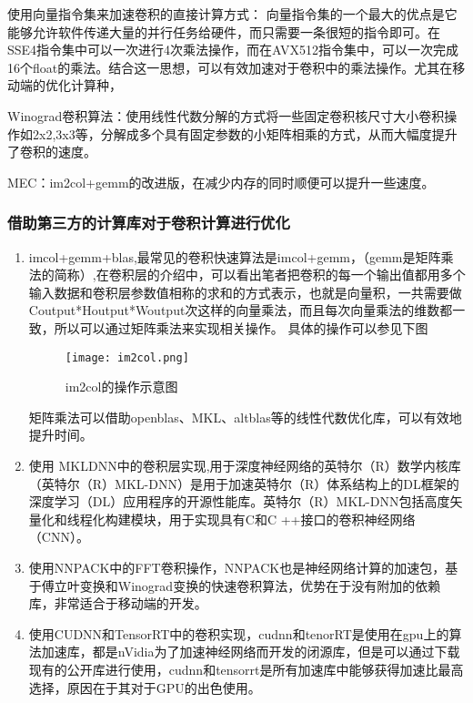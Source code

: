 使用向量指令集来加速卷积的直接计算方式：
向量指令集的一个最大的优点是它能够允许软件传递大量的并行任务给硬件，而只需要一条很短的指令即可。在SSE4指令集中可以一次进行4次乘法操作，而在AVX512指令集中，可以一次完成16个float的乘法。结合这一思想，可以有效加速对于卷积中的乘法操作。尤其在移动端的优化计算种，

Winograd卷积算法：使用线性代数分解的方式将一些固定卷积核尺寸大小卷积操作如2x2,3x3等，分解成多个具有固定参数的小矩阵相乘的方式，从而大幅度提升了卷积的速度。

MEC：im2col+gemm的改进版，在减少内存的同时顺便可以提升一些速度。
\subsubsection{借助第三方的计算库对于卷积计算进行优化}

\begin{enumerate}
\item imcol+gemm+blas,最常见的卷积快速算法是imcol+gemm，（gemm是矩阵乘法的简称）,在卷积层的介绍中，可以看出笔者把卷积的每一个输出值都用多个输入数据和卷积层参数值相称的求和的方式表示，也就是向量积，一共需要做Coutput*Houtput*Woutput次这样的向量乘法，而且每次向量乘法的维数都一致，所以可以通过矩阵乘法来实现相关操作。
具体的操作可以参见下图

\begin{figure}[!ht]
 \centering
	\texttt{[image: im2col.png]}
	\caption{im2col的操作示意图}
\end{figure}

矩阵乘法可以借助openblas、MKL、altblas等的线性代数优化库，可以有效地提升时间。
\item 使用 MKLDNN中的卷积层实现,用于深度神经网络的英特尔（R）数学内核库（英特尔（R）MKL-DNN）是用于加速英特尔（R）体系结构上的DL框架的深度学习（DL）应用程序的开源性能库。英特尔（R）MKL-DNN包括高度矢量化和线程化构建模块，用于实现具有C和C ++接口的卷积神经网络（CNN）。

\item 使用NNPACK中的FFT卷积操作，NNPACK也是神经网络计算的加速包，基于傅立叶变换和Winograd变换的快速卷积算法，优势在于没有附加的依赖库，非常适合于移动端的开发。

\item 使用CUDNN和TensorRT中的卷积实现，cudnn和tenorRT是使用在gpu上的算法加速库，都是nVidia为了加速神经网络而开发的闭源库，但是可以通过下载现有的公开库进行使用，cudnn和tensorrt是所有加速库中能够获得加速比最高选择，原因在于其对于GPU的出色使用。
\end{enumerate}


